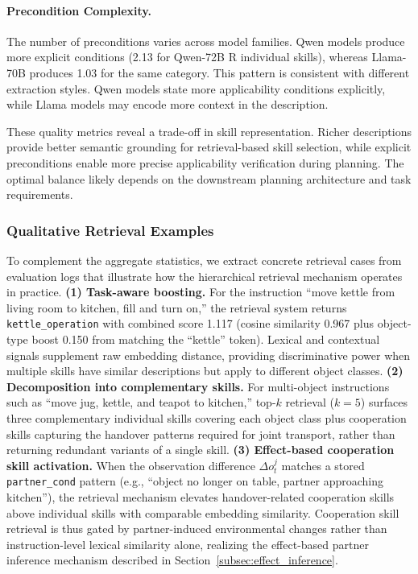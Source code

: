\documentclass{article}
\theoremstyle{plain}
\theoremstyle{definition}
\theoremstyle{remark}
\begin{document}
\paragraph{Precondition Complexity.}
The number of preconditions varies across model families. Qwen models produce more explicit conditions (2.13 for Qwen-72B R individual skills), whereas Llama-70B produces 1.03 for the same category. This pattern is consistent with different extraction styles. Qwen models state more applicability conditions explicitly, while Llama models may encode more context in the description.

These quality metrics reveal a trade-off in skill representation. Richer descriptions provide better semantic grounding for retrieval-based skill selection, while explicit preconditions enable more precise applicability verification during planning. The optimal balance likely depends on the downstream planning architecture and task requirements.

\subsubsection{Qualitative Retrieval Examples}
\label{subsec:retrieval_examples}

To complement the aggregate statistics, we extract concrete retrieval cases from evaluation logs that illustrate how the hierarchical retrieval mechanism operates in practice. \textbf{(1) Task-aware boosting.} For the instruction ``move kettle from living room to kitchen, fill and turn on,'' the retrieval system returns \texttt{kettle\_operation} with combined score 1.117 (cosine similarity 0.967 plus object-type boost 0.150 from matching the ``kettle'' token). Lexical and contextual signals supplement raw embedding distance, providing discriminative power when multiple skills have similar descriptions but apply to different object classes. \textbf{(2) Decomposition into complementary skills.} For multi-object instructions such as ``move jug, kettle, and teapot to kitchen,'' top-$k$ retrieval ($k{=}5$) surfaces three complementary individual skills covering each object class plus cooperation skills capturing the handover patterns required for joint transport, rather than returning redundant variants of a single skill. \textbf{(3) Effect-based cooperation skill activation.} When the observation difference $\Delta o_t^j$ matches a stored \texttt{partner\_cond} pattern (e.g., ``object no longer on table, partner approaching kitchen''), the retrieval mechanism elevates handover-related cooperation skills above individual skills with comparable embedding similarity. Cooperation skill retrieval is thus gated by partner-induced environmental changes rather than instruction-level lexical similarity alone, realizing the effect-based partner inference mechanism described in Section~\ref{subsec:effect_inference}.
\end{document}
